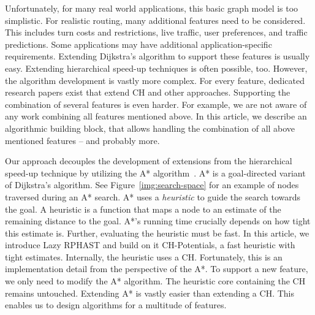 \documentclass[manuscript,review]{acmart}
\begin{document}
Unfortunately, for many real world applications, this basic graph model is too simplistic.
For realistic routing, many additional features need to be considered.
This includes turn costs and restrictions, live traffic, user preferences, and traffic predictions. %
Some applications may have additional application-specific requirements.
Extending Dijkstra's algorithm to support these features is usually easy.
Extending hierarchical speed-up techniques is often possible, too.
However, the algorithm development is vastly more complex.
For every feature, dedicated research papers exist that extend CH and other approaches.
Supporting the combination of several features is even harder.
For example, we are not aware of any work combining all features mentioned above.
In this article, we describe an algorithmic building block, that allows handling the combination of all above mentioned features -- and probably more.

Our approach decouples the development of extensions from the hierarchical speed-up technique by utilizing the A* algorithm~\cite{hnr-afbhd-68}.
A* is a goal-directed variant of Dijkstra's algorithm.
See Figure~\ref{img:search-space} for an example of nodes traversed during an A* search.
A* uses a \emph{heuristic} to guide the search towards the goal.
A heuristic is a function that maps a node to an estimate of the remaining distance to the goal.
A*'s running time crucially depends on how tight this estimate is.
Further, evaluating the heuristic must be fast.
In this article, we introduce Lazy RPHAST and build on it CH-Potentials, a fast heuristic with tight estimates.
Internally, the heuristic uses a CH.
Fortunately, this is an implementation detail from the perspective of the A*.
To support a new feature, we only need to modify the A* algorithm.
The heuristic core containing the CH remains untouched.
Extending A* is vastly easier than extending a CH.
This enables us to design algorithms for a multitude of features.
\end{document}

